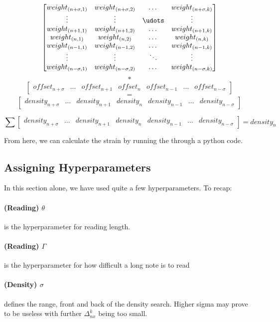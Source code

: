 \documentclass{article}
\begin{document}
\[ 	
\begin{bmatrix}
	weight_{(n+\sigma,1)} & weight_{(n+\sigma,2)} & \dots  & weight_{(n+\sigma,k)} \\
	\vdots & \vdots & \udots & \vdots \\
	weight_{(n+1,1)} & weight_{(n+1,2)} & \dots  & weight_{(n+1,k)} \\
	weight_{(n,1)} & weight_{(n,2)} & \dots  & weight_{(n,k)} \\
    weight_{(n-1,1)} & weight_{(n-1,2)} & \dots  & weight_{(n-1,k)} \\
    \vdots & \vdots & \ddots & \vdots \\
    weight_{(n-\sigma,1)} & weight_{(n-\sigma,2)} & \dots  & weight_{(n-\sigma,k)}
\end{bmatrix}
\]
$$ * $$
\[
\begin{bmatrix}
	offset_{n+\sigma} & \dots & offset_{n+1} & offset_{n} & offset_{n-1} & \dots & offset_{n-\sigma} 
\end{bmatrix}
\]
$$ = $$
\[
\begin{bmatrix}
	density_{n+\sigma} & \dots & density_{n+1} & density_{n} & density_{n-1} & \dots & density_{n-\sigma} 
\end{bmatrix}
\]

$$ \sum
\begin{bmatrix}
	density_{n+\sigma} & \dots & density_{n+1} & density_{n} & density_{n-1} & \dots & density_{n-\sigma} 
\end{bmatrix}
= density_n
$$ 

From here, we can calculate the strain by running the through a python code.

\subsection{Assigning Hyperparameters}

In this section alone, we have used quite a few hyperparameters. To recap:

\paragraph{(Reading) $\theta$} is the hyperparameter for reading length.
\paragraph{(Reading) $\Gamma$} is the hyperparameter for how difficult a long note is to read

\paragraph{(Density) $\sigma$} defines the range, front and back of the density search. Higher sigma may prove to be useless with further $\Delta_{nx}^k$ being too small.
\end{document}

